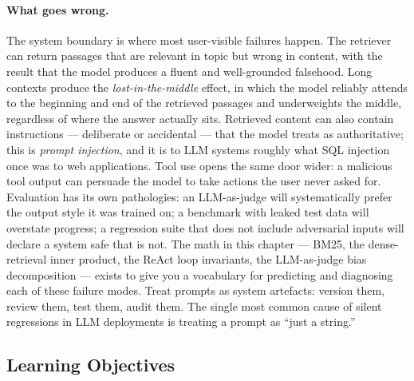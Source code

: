 \paragraph{What goes wrong.}
The system boundary is where most user-visible failures happen.
The retriever can return passages that are relevant in topic but
wrong in content, with the result that the model produces a
fluent and well-grounded falsehood. Long contexts produce the
\emph{lost-in-the-middle} effect, in which the model reliably
attends to the beginning and end of the retrieved passages and
underweights the middle, regardless of where the answer actually
sits. Retrieved content can also contain instructions ---
deliberate or accidental --- that the model treats as authoritative;
this is \emph{prompt injection}, and it is to LLM systems roughly
what SQL injection once was to web applications. Tool use opens
the same door wider: a malicious tool output can persuade the
model to take actions the user never asked for. Evaluation has its
own pathologies: an LLM-as-judge will systematically prefer the
output style it was trained on; a benchmark with leaked test data
will overstate progress; a regression suite that does not include
adversarial inputs will declare a system safe that is not. The
math in this chapter --- BM25, the dense-retrieval inner product,
the ReAct loop invariants, the LLM-as-judge bias decomposition ---
exists to give you a vocabulary for predicting and diagnosing each
of these failure modes. Treat prompts as system artefacts: version
them, review them, test them, audit them. The single most common
cause of silent regressions in LLM deployments is treating a prompt
as ``just a string.''

\subsection{Learning Objectives}

